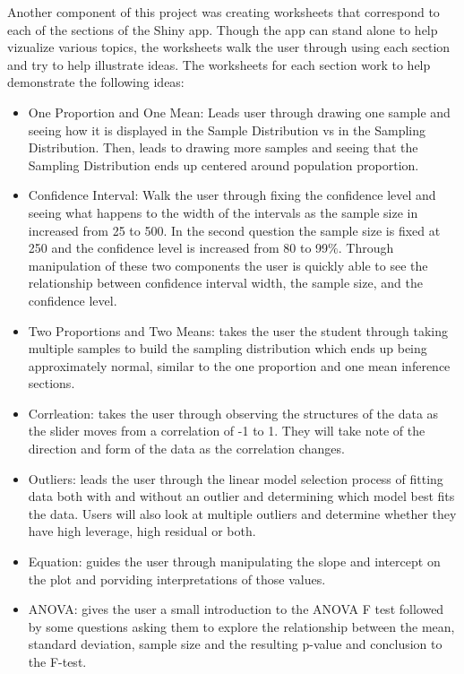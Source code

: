 \documentclass[11pt]{book}
\begin{document}
Another component of this project was creating worksheets that correspond to each of the sections of the Shiny app. Though the app can stand alone to help vizualize various topics, the worksheets walk the user through using each section and try to help illustrate ideas. The worksheets for each section work to help demonstrate the following ideas:
\begin{itemize}

\item One Proportion and One Mean: Leads user through drawing one sample and seeing how it is displayed in the Sample Distribution vs in the Sampling Distribution. Then, leads to drawing more samples and seeing that the Sampling Distribution ends up centered around population proportion.  

\item   Confidence Interval: Walk the user through fixing the confidence level and seeing what happens to the width of the intervals as the sample size in increased from 25 to 500. In the second question the sample size is fixed at 250 and the confidence level is increased from 80 to 99$\%$.  Through manipulation of these two components the user is quickly able to see the relationship between confidence interval width, the sample size, and the confidence level.
  
\item   Two Proportions and Two Means: takes the user the student through taking multiple samples to build the sampling distribution which ends up being approximately normal, similar to the one proportion and one mean inference sections.
  
\item   Corrleation: takes the user through observing the structures of the data as the slider moves from a correlation of -1 to 1. They will take note of the direction and form of the data as the correlation changes. 

\item Outliers: leads the user through the linear model selection process of fitting data both with and without an outlier and determining which model best fits the data.  Users will also look at multiple outliers and determine whether they have high leverage, high residual or both.

\item Equation: guides the user through manipulating the slope and intercept on the plot and porviding interpretations of those values.
  
\item   ANOVA:  gives the user a small introduction to the ANOVA F test followed by some questions asking them to explore the relationship between the mean, standard deviation, sample size and the resulting p-value and conclusion to the F-test. 
\end{itemize}

\end{document}
